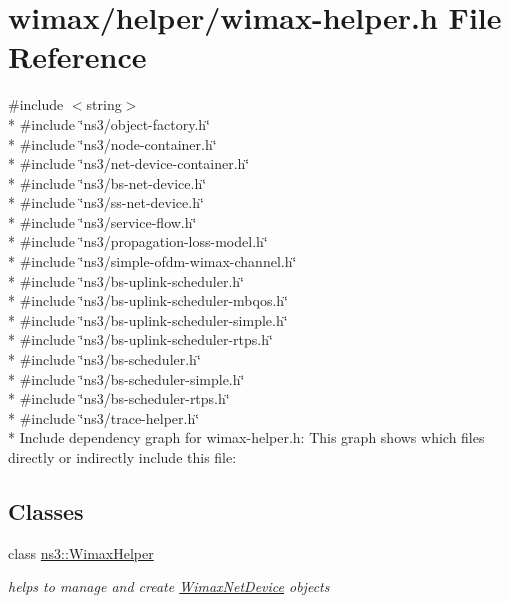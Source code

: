 \hypertarget{wimax-helper_8h}{}\section{wimax/helper/wimax-\/helper.h File Reference}
\label{wimax-helper_8h}
{\ttfamily \#include $<$string$>$}\\*
{\ttfamily \#include \char`\"{}ns3/object-\/factory.\+h\char`\"{}}\\*
{\ttfamily \#include \char`\"{}ns3/node-\/container.\+h\char`\"{}}\\*
{\ttfamily \#include \char`\"{}ns3/net-\/device-\/container.\+h\char`\"{}}\\*
{\ttfamily \#include \char`\"{}ns3/bs-\/net-\/device.\+h\char`\"{}}\\*
{\ttfamily \#include \char`\"{}ns3/ss-\/net-\/device.\+h\char`\"{}}\\*
{\ttfamily \#include \char`\"{}ns3/service-\/flow.\+h\char`\"{}}\\*
{\ttfamily \#include \char`\"{}ns3/propagation-\/loss-\/model.\+h\char`\"{}}\\*
{\ttfamily \#include \char`\"{}ns3/simple-\/ofdm-\/wimax-\/channel.\+h\char`\"{}}\\*
{\ttfamily \#include \char`\"{}ns3/bs-\/uplink-\/scheduler.\+h\char`\"{}}\\*
{\ttfamily \#include \char`\"{}ns3/bs-\/uplink-\/scheduler-\/mbqos.\+h\char`\"{}}\\*
{\ttfamily \#include \char`\"{}ns3/bs-\/uplink-\/scheduler-\/simple.\+h\char`\"{}}\\*
{\ttfamily \#include \char`\"{}ns3/bs-\/uplink-\/scheduler-\/rtps.\+h\char`\"{}}\\*
{\ttfamily \#include \char`\"{}ns3/bs-\/scheduler.\+h\char`\"{}}\\*
{\ttfamily \#include \char`\"{}ns3/bs-\/scheduler-\/simple.\+h\char`\"{}}\\*
{\ttfamily \#include \char`\"{}ns3/bs-\/scheduler-\/rtps.\+h\char`\"{}}\\*
{\ttfamily \#include \char`\"{}ns3/trace-\/helper.\+h\char`\"{}}\\*
Include dependency graph for wimax-\/helper.h\+:
This graph shows which files directly or indirectly include this file\+:
\subsection*{Classes}
\begin{DoxyCompactItemize}
\item 
class \hyperlink{classns3_1_1WimaxHelper}{ns3\+::\+Wimax\+Helper}
\begin{DoxyCompactList}\small\item\em helps to manage and create \hyperlink{classns3_1_1WimaxNetDevice}{Wimax\+Net\+Device} objects \end{DoxyCompactList}\end{DoxyCompactItemize}
